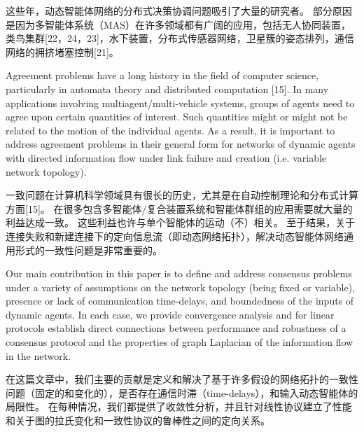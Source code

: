\documentclass{article}
\begin{document}
\noindent 这些年，动态智能体网络的分布式决策协调问题吸引了大量的研究者。
部分原因是因为多智能体系统（MAS）在许多领域都有广阔的应用，包括无人协同装置，类鸟集群[22，24，23]，水下装置，分布式传感器网络，卫星簇的姿态排列，通信网络的拥挤堵塞控制[21]。

{\color[gray]{0.5}
Agreement problems have a long history in the ﬁeld of computer science, particularly in automata theory and distributed computation [15]. 
In many applications involving multiagent/multi-vehicle systems, groups of agents need to agree upon certain quantities of {\color{green}interest}. 
Such quantities might or might not be related to the motion of the individual agents. 
As a result, it is important to address agreement problems in their general form for networks of dynamic agents with directed information ﬂow under link failure and creation (i.e. variable network topology).
}

一致问题在计算机科学领域具有很长的历史，尤其是在自动控制理论和分布式计算方面[15]。
在很多包含多智能体/复合装置系统和智能体群组的应用需要就大量的利益达成一致。
这些利益也许与单个智能体的运动（不）相关。
至于结果，关于连接失败和新建连接下的定向信息流（即动态网络拓扑），解决动态智能体网络通用形式的一致性问题是非常重要的。

{\color[gray]{0.5}
Our main contribution in this paper is to deﬁne and address consensus problems under a variety of assumptions on the network topology (being ﬁxed or variable), presence or lack of communication time-delays, and boundedness of the inputs of dynamic agents. 
In each case, we provide convergence analysis and for linear protocols establish direct connections between performance and robustness of a consensus protocol and the properties of graph Laplacian of the information ﬂow in the network.
}

在这篇文章中，我们主要的贡献是定义和解决了基于许多假设的网络拓扑的一致性问题（固定的和变化的），是否存在通信时滞（time-delays），和输入动态智能体的局限性。
在每种情况，我们都提供了收敛性分析，并且针对线性协议建立了性能和关于图的拉氏变化和一致性协议的鲁棒性之间的定向关系。
\end{document}
